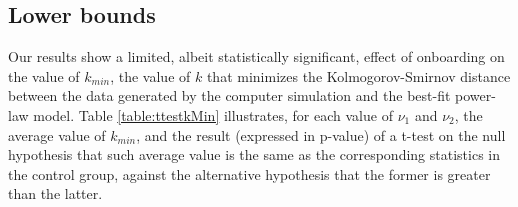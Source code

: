 \documentclass{nws}
\begin{document}
\subsection{Lower bounds} \label {ssec:lower bounds}

Our results show a limited, albeit statistically significant, effect of onboarding on the value of $k_{min}$, the value of $k$ that minimizes the Kolmogorov-Smirnov distance between the data generated by the computer simulation and the best-fit power-law model. Table \ref {table:ttestkMin} illustrates, for each value of  $\nu_1$ and $\nu_2$, the average value of $k_{min}$, and the result (expressed in p-value) of a t-test on the null hypothesis that such average value is the same as the corresponding statistics in the control group, against the alternative hypothesis that the former is greater than the latter. 
\end{document}
